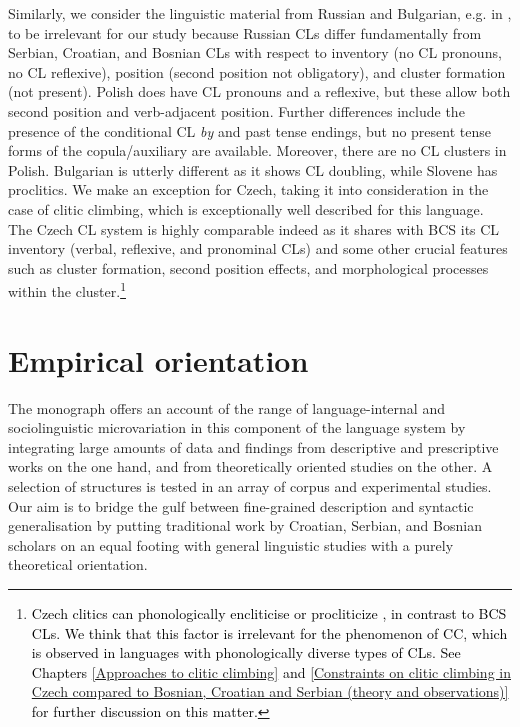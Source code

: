 {Similarly, we consider the linguistic material from Russian and Bulgarian, e.g. in \citet{Landau00, Landau04, Landau13}, to be irrelevant for our study because Russian CLs differ fundamentally from Serbian, Croatian, and Bosnian CLs with respect to inventory (no CL pronouns, no CL reflexive), position (second position not obligatory), and cluster formation (not present). Polish does have CL pronouns and a reflexive, but these allow both second position and verb-adjacent position. Further differences include the presence of the conditional CL \textit{by} and past tense endings, but no present tense forms of the copula/auxiliary are available. Moreover, there are no CL clusters in Polish. Bulgarian is utterly different as it shows CL doubling, while Slovene has proclitics. We make an exception for Czech, taking it into consideration in the case of clitic climbing, which is exceptionally well described for this language. The Czech CL system is highly comparable indeed as it shares with BCS its CL inventory (verbal, reflexive, and pronominal CLs) and some other crucial features such as cluster formation, second position effects, and morphological processes within the cluster.}\footnote{\textcolor{black}{Czech clitics can phonologically encliticise or procliticize \citep[295 and citations therein]{Lenertova01}, in contrast to BCS CLs. We think that this factor is irrelevant for the phenomenon of CC, which is observed in languages with phonologically diverse types of CLs. See Chapters \ref{Approaches to clitic climbing} and \ref{Constraints on clitic climbing in Czech compared to Bosnian, Croatian and Serbian (theory and observations)} for further discussion on this matter.}}

\section{Empirical orientation}
\label{Empirical orientation}
The monograph offers an account of the range of language-internal and sociolinguistic microvariation in this component of the language system by integrating large amounts of data and findings from descriptive and prescriptive works on the one hand, and from theoretically oriented studies on the other. A selection of structures is tested in an array of corpus and experimental studies. Our aim is to bridge the gulf between fine-grained description and syntactic generalisation by putting traditional work by Croatian, Serbian, and Bosnian scholars on an equal footing with general linguistic studies with a purely theoretical orientation. 

